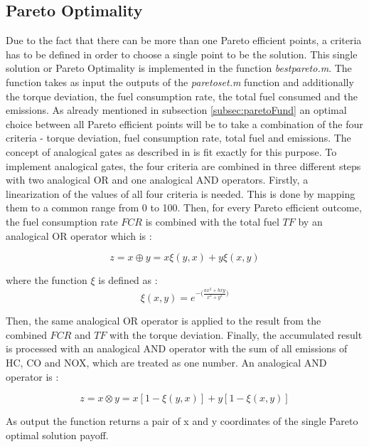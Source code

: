 \subsection{Pareto Optimality}
\label{subsec:paretoImpl}
Due to the fact that there can be more than one Pareto efficient points, a criteria has to be defined in order to choose a single point to be the solution. This single solution or Pareto Optimality is implemented in the function \textit{bestpareto.m}. The function takes as input the outputs of the \textit{paretoset.m} function and additionally the torque deviation, the fuel consumption rate, the total fuel consumed and the emissions. As already mentioned in subsection \ref{subsec:paretoFund} an optimal choice between all Pareto efficient points will be to take a combination of the four criteria - torque deviation, fuel consumption rate, total fuel and emissions. The concept of analogical gates as described in \citet{badreddin1995analogical} is fit exactly for this purpose. To implement analogical gates, the four criteria are combined in three different steps with two analogical OR and one analogical AND operators. Firstly, a linearization of the values of all four criteria is needed. This is done by mapping them to a common range from 0 to 100. Then, for every Pareto efficient outcome, the fuel consumption rate $FCR$ is combined with the total fuel $TF$ by an analogical OR operator which is \citep{badreddin1995analogical}:

\begin{equation}
z = x \oplus y = x \xi(y,x) + y \xi(x,y)
\end{equation}

where the function $\xi$ is defined as \citet{badreddin1995analogical}:
\begin{equation}
\xi(x,y) =  e^{-\Big(\frac{ax^2+bxy}{x^2+y^2}\Big)}
\end{equation}

Then, the same analogical OR operator is applied to the result from the combined $FCR$ and $TF$ with the torque deviation. Finally, the accumulated result is processed with an analogical AND operator with the sum of all emissions of HC, CO and NOX, which are treated as one number. An analogical AND operator is \citet{badreddin1995analogical}:

\begin{equation}
z = x \otimes y = x[1 - \xi(y,x)] + y[1 - \xi(x,y)]
\end{equation}

As output the function returns a pair of x and y coordinates of the single Pareto optimal solution payoff.


